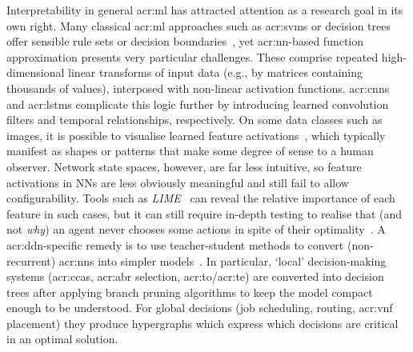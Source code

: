 Interpretability in general \gls{acr:ml} has attracted attention as a research goal in its own right.
Many classical \gls{acr:ml} approaches such as \glspl{acr:svm} or decision trees offer sensible rule sets or decision boundaries~\parencite{DBLP:conf/pkdd/MolnarCB20,interpretable-ml}, yet \gls{acr:nn}-based function approximation presents very particular challenges.
These comprise repeated high-dimensional linear transforms of input data (e.g., by matrices containing thousands of values), interposed with non-linear activation functions.
\glspl{acr:cnn} and \glspl{acr:lstm} complicate this logic further by introducing learned convolution filters and temporal relationships, respectively.
On some data classes such as images, it is possible to visualise learned feature activations~\parencite{cnn-features-distil}, which typically manifest as shapes or patterns that make some degree of sense to a human observer.
Network state spaces, however, are far less intuitive, so feature activations in NNs are less obviously meaningful and still fail to allow configurability.
Tools such as \emph{LIME}~\parencite{DBLP:conf/kdd/Ribeiro0G16} can reveal the relative importance of each feature in such cases, but it can still require in-depth testing to realise that (and not \emph{why}) an agent never chooses some actions in spite of their optimality~\parencite{DBLP:conf/sigcomm/DethiseCK19}.
A \gls{acr:ddn}-specific remedy is to use teacher-student methods to convert (non-recurrent) \glspl{acr:nn} into simpler models~\parencite{DBLP:conf/sigcomm/MengWBXMH20}.
In particular, `local' decision-making systems (\glspl{acr:cca}, \gls{acr:abr} selection, \gls{acr:to}/\gls{acr:te}) are converted into decision trees after applying branch pruning algorithms to keep the model compact enough to be understood.
For global decisions (job scheduling, routing, \gls{acr:vnf} placement) they produce hypergraphs which express which decisions are critical in an optimal solution.
